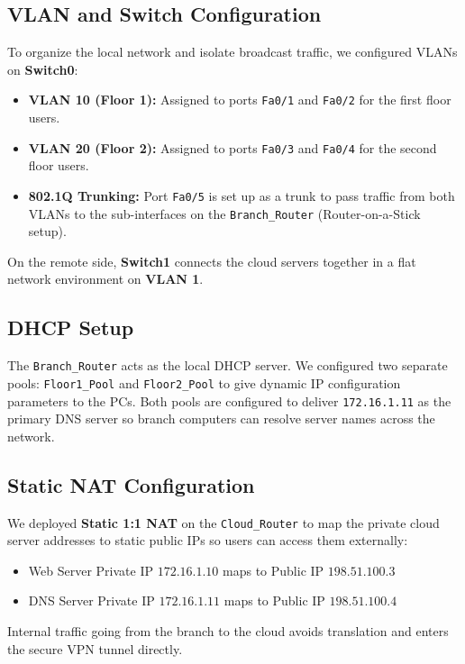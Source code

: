\documentclass[12pt,a4paper]{article}
\begin{document}
\subsection{VLAN and Switch Configuration}
To organize the local network and isolate broadcast traffic, we configured VLANs on \textbf{Switch0}:
\begin{itemize}
    \item \textbf{VLAN 10 (Floor 1):} Assigned to ports \texttt{Fa0/1} and \texttt{Fa0/2} for the first floor users.
    \item \textbf{VLAN 20 (Floor 2):} Assigned to ports \texttt{Fa0/3} and \texttt{Fa0/4} for the second floor users.
    \item \textbf{802.1Q Trunking:} Port \texttt{Fa0/5} is set up as a trunk to pass traffic from both VLANs to the sub-interfaces on the \texttt{Branch\_Router} (Router-on-a-Stick setup).
\end{itemize}
On the remote side, \textbf{Switch1} connects the cloud servers together in a flat network environment on \textbf{VLAN 1}.

\subsection{DHCP Setup}
The \texttt{Branch\_Router} acts as the local DHCP server. We configured two separate pools: \texttt{Floor1\_Pool} and \texttt{Floor2\_Pool} to give dynamic IP configuration parameters to the PCs. Both pools are configured to deliver \texttt{172.16.1.11} as the primary DNS server so branch computers can resolve server names across the network.

\subsection{Static NAT Configuration}
We deployed \textbf{Static 1:1 NAT} on the \texttt{Cloud\_Router} to map the private cloud server addresses to static public IPs so users can access them externally:
\begin{itemize}
    \item Web Server Private IP $172.16.1.10$ maps to Public IP $198.51.100.3$
    \item DNS Server Private IP $172.16.1.11$ maps to Public IP $198.51.100.4$
\end{itemize}
Internal traffic going from the branch to the cloud avoids translation and enters the secure VPN tunnel directly.
\end{document}
